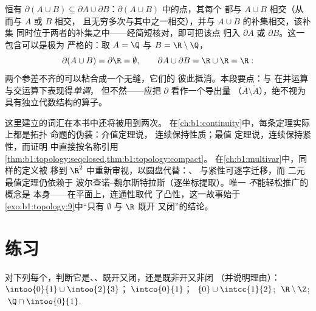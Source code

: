 \begin{example}[并集下的边界]\label{ex:b1:topology:boundaryunion}
恒有 $\partial(A \cup B) \subseteq \partial A \cup \partial
B$：$\partial(A \cup B)$ 中的点，其每个
都与 $A \cup B$ 相交（从而与 $A$ 或 $B$ 相交，
且无穷多次与其中之一相交），并与 $A \cup B$ 的补集相交，该补集
同时位于两者的补集之中——经简短核对，即可把该点
归入 $\partial A$ 或 $\partial B$。这一包含可以是极为
严格的：取 $A = \Q$ 与 $B = \R\setminus\Q$，
\[
\partial(A \cup B) = \partial \R = \emptyset ,
\qquad
\partial A \cup \partial B = \R \cup \R = \R :
\]
两个参差不齐的可以粘合成一个无缝，它们的
彼此抵消。本段要点：与
在并运算与交运算下表现得\emph{单调}，
但不然——应把 $\partial$ 看作一个导出量
（$\overline A \setminus \mathring A$），绝不视为
具有独立代数结构的算子。
\end{example}

\begin{remark}[本分册中的视角]
这里建立的词汇在本书中还将被用到两次。
在\cref{ch:b1:continuity}中，每条定理实际上都是拓扑
命题的伪装：介值定理说，
连续保持性质；最值
定理说，连续保持紧性，而证明
中直接按名称引用\cref{thm:b1:topology:seqclosed,thm:b1:topology:compact}。
在\cref{ch:b1:multivar}中，同样的定义被
移到 $\R^2$ 中重新审视，以圆盘代替：、
与紧性可逐字迁移，而
二元最值定理仍依赖于
波尔查诺--魏尔斯特拉斯（逐坐标提取）。唯一
\emph{不}能轻松推广的概念是
本身——在平面上，连通性取代
了凸性，这一故事始于
\cref{exo:b1:topology:9}中“只有 $\emptyset$ 与 $\R$ 既开
又闭”的结论。
\end{remark}

\section{练习}

\begin{exercise}[$\star$]\label{exo:b1:topology:1}
对下列每个，判断它是、、既开又闭，还是既非开又非闭
（并说明理由）：$\intoo{0}{1} \cup \intoo{2}{3}$；$\;\intco{0}{1}$；
$\;\{0\} \cup \intcc{1}{2}$; $\;\R \setminus \Z$; $\;\Q \cap
\intoo{0}{1}$.
\end{exercise}

